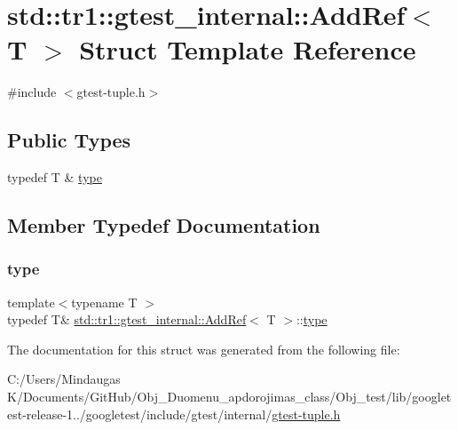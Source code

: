 \hypertarget{structstd_1_1tr1_1_1gtest__internal_1_1_add_ref}{}\section{std\+::tr1\+::gtest\+\_\+internal\+::Add\+Ref$<$ T $>$ Struct Template Reference}
\label{structstd_1_1tr1_1_1gtest__internal_1_1_add_ref}


{\ttfamily \#include $<$gtest-\/tuple.\+h$>$}

\subsection*{Public Types}
\begin{DoxyCompactItemize}
\item 
typedef T \& \mbox{\hyperlink{structstd_1_1tr1_1_1gtest__internal_1_1_add_ref_a1e5616e414125574c1653e3a1fc68491}{type}}
\end{DoxyCompactItemize}


\subsection{Member Typedef Documentation}
\mbox{\label{structstd_1_1tr1_1_1gtest__internal_1_1_add_ref_a1e5616e414125574c1653e3a1fc68491}} 
\subsubsection{\texorpdfstring{type}{type}}
{\footnotesize\ttfamily template$<$typename T $>$ \\
typedef T\& \mbox{\hyperlink{structstd_1_1tr1_1_1gtest__internal_1_1_add_ref}{std\+::tr1\+::gtest\+\_\+internal\+::\+Add\+Ref}}$<$ T $>$\+::\mbox{\hyperlink{structstd_1_1tr1_1_1gtest__internal_1_1_add_ref_a1e5616e414125574c1653e3a1fc68491}{type}}}



The documentation for this struct was generated from the following file\+:\begin{DoxyCompactItemize}
\item 
C\+:/\+Users/\+Mindaugas K/\+Documents/\+Git\+Hub/\+Obj\+\_\+\+Duomenu\+\_\+apdorojimas\+\_\+class/\+Obj\+\_\+test/lib/googletest-\/release-\/1../googletest/include/gtest/internal/\mbox{\hyperlink{gtest-tuple_8h}{gtest-\/tuple.\+h}}\end{DoxyCompactItemize}
